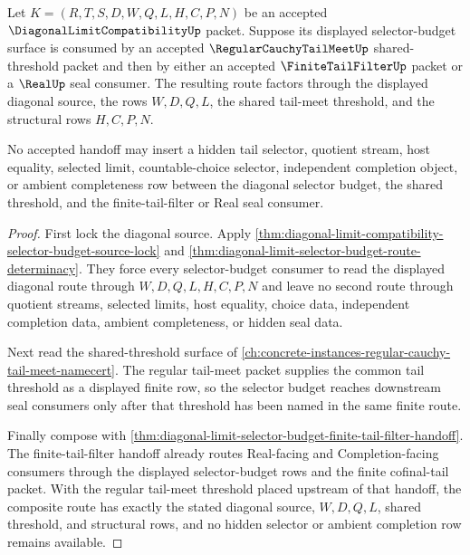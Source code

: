 \begin{theorem}
\label{thm:diagonal-limit-selector-budget-regular-tail-meet-handoff}
Let $K=(R,T,S,D,W,Q,L,H,C,P,N)$ be an accepted $\DiagonalLimitCompatibilityUp$ packet. Suppose its displayed selector-budget surface is consumed by an accepted $\RegularCauchyTailMeetUp$ shared-threshold packet and then by either an accepted $\FiniteTailFilterUp$ packet or a $\RealUp$ seal consumer. The resulting route factors through the displayed diagonal source, the rows $W,D,Q,L$, the shared tail-meet threshold, and the structural rows $H,C,P,N$.

No accepted handoff may insert a hidden tail selector, quotient stream, host equality, selected limit, countable-choice selector, independent completion object, or ambient completeness row between the diagonal selector budget, the shared threshold, and the finite-tail-filter or Real seal consumer.
\end{theorem}
\begin{proof}
First lock the diagonal source. Apply \autoref{thm:diagonal-limit-compatibility-selector-budget-source-lock} and \autoref{thm:diagonal-limit-selector-budget-route-determinacy}. They force every selector-budget consumer to read the displayed diagonal route through $W,D,Q,L,H,C,P,N$ and leave no second route through quotient streams, selected limits, host equality, choice data, independent completion data, ambient completeness, or hidden seal data.

Next read the shared-threshold surface of \autoref{ch:concrete-instances-regular-cauchy-tail-meet-namecert}. The regular tail-meet packet supplies the common tail threshold as a displayed finite row, so the selector budget reaches downstream seal consumers only after that threshold has been named in the same finite route.

Finally compose with \autoref{thm:diagonal-limit-selector-budget-finite-tail-filter-handoff}. The finite-tail-filter handoff already routes Real-facing and Completion-facing consumers through the displayed selector-budget rows and the finite cofinal-tail packet. With the regular tail-meet threshold placed upstream of that handoff, the composite route has exactly the stated diagonal source, $W,D,Q,L$, shared threshold, and structural rows, and no hidden selector or ambient completion row remains available.
\end{proof}

